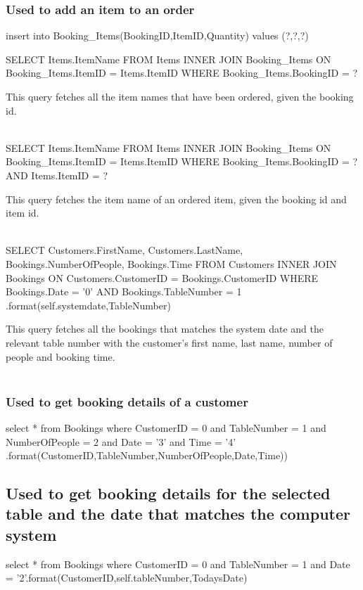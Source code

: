 \subsubsection{Used to add an item to an order}
\begin{sql}
insert into Booking_Items(BookingID,ItemID,Quantity) values (?,?,?)
\end{sql}


\begin{sql}
SELECT
Items.ItemName
FROM Items
 INNER JOIN Booking_Items
ON Booking_Items.ItemID = Items.ItemID
WHERE Booking_Items.BookingID = ?
\end{sql}
This query fetches all the item names that have been ordered, given the  booking id.  \\ \\

\begin{sql}
SELECT
 Items.ItemName
 FROM Items
INNER JOIN Booking_Items
ON Booking_Items.ItemID = Items.ItemID
 WHERE Booking_Items.BookingID = ?
 AND Items.ItemID = ?
\end{sql}
This query fetches the item name of an ordered item, given the booking id and item id. \\ \\

\begin{sql}
SELECT
 Customers.FirstName,
 Customers.LastName,
 Bookings.NumberOfPeople,
 Bookings.Time
 FROM Customers
INNER JOIN Bookings
ON Customers.CustomerID = Bookings.CustomerID
WHERE Bookings.Date = '{0}'
AND Bookings.TableNumber = {1}
.format(self.systemdate,TableNumber)
\end{sql}
This query fetches all the bookings that matches the system date and the relevant table number with the customer's first name, last name, number of people and booking time. \\ \\

\subsubsection{Used to get booking details of a customer}

\begin{sql}
select * from Bookings where CustomerID = {0} and TableNumber = {1} and NumberOfPeople = {2} and Date = '{3}' and Time = '{4}' .format(CustomerID,TableNumber,NumberOfPeople,Date,Time))
\end{sql}

\subsection{Used to get booking details for the selected table and the date that matches the computer system}
\begin{sql}
select * from Bookings where CustomerID = {0} and TableNumber = {1} and Date = '{2}'.format(CustomerID,self.tableNumber,TodaysDate)
\end{sql}


